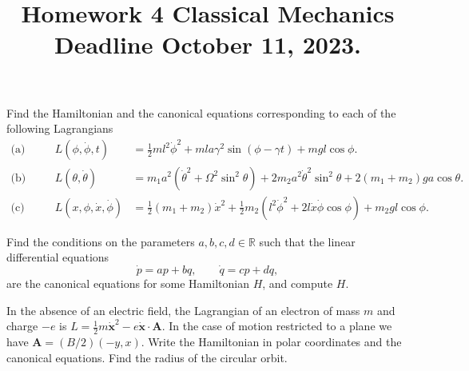 \documentclass[12pt]{article}
\newenvironment{problem}[2][Problem]{\begin{trivlist}
\item[\hskip \labelsep {\bfseries #1}\hskip \labelsep {\bfseries #2.}]}{\end{trivlist}}
\begin{document}
 
 
\title{Homework 4 Classical Mechanics\\Deadline October 11, 2023.}
\date{}
 
\maketitle


\begin{problem}{1}
Find the Hamiltonian and the canonical equations corresponding to each of the following Lagrangians 
\begin{align}
\text{(a)}&\quad & L(\phi,\dot{\phi},t)&=\frac{1}{2} m l^2\dot{\phi}^2+mla\gamma^2\sin(\phi-\gamma t)+mgl\cos\phi.
\\
\text{(b)}&\quad &L(\theta,\dot{\theta})&=m_1 a^2(\dot{\theta}^2+\Omega^2\sin^2\theta)+2m_2 a^2 \dot{\theta}^2 \sin^2\theta+2(m_1+m_2)g a \cos\theta.
\\
\text{(c)}&\quad & L (x,\phi,\dot{x},\dot{\phi}) &= \frac{1}{2} (m_1+m_2) \dot{x}^2+\frac{1}{2}m_2\left(l^2\dot{\phi}^2+2l\dot{x}\dot{\phi}\cos\phi\right)+m_2 g l \cos\phi.
\end{align}
\end{problem}

\begin{problem}{2}
Find the conditions on the parameters $a, b, c, d \in \mathbb{R}$  such that the linear differential equations
\begin{equation}
\dot{p}=a p + b q,\qquad \dot{q}=c p+ d q,
\end{equation}
are the canonical equations for some Hamiltonian $H$, and compute $H$.
\end{problem}

\begin{problem}{3}
In the absence of an electric field, the Lagrangian of an electron of mass $m$ and charge $-e$ is $L = \frac{1}{2}m\dot{\mathbf{x}}^2 - e\dot{\mathbf{x}}\cdot\mathbf{A}$. In the case of motion restricted to a plane we have $ \mathbf{A} = (B/2)(-y,x)$. Write the Hamiltonian in polar coordinates and the canonical equations. Find the radius of the circular orbit.
\end{problem}
\end{document}
